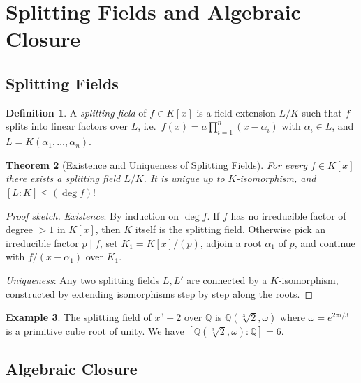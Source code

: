 \documentclass[12pt,a4paper]{amsart}
\newtheorem{theorem}{Theorem}[section]
\theoremstyle{definition}
\newtheorem{definition}[theorem]{Definition}
\newtheorem{example}[theorem]{Example}
\newcommand{\Q}{\mathbb{Q}}
\begin{document}
\section{Splitting Fields and Algebraic Closure}\label{sec:splitting}

\subsection{Splitting Fields}

\begin{definition}
A \emph{splitting field} of $f \in K[x]$ is a field extension $L/K$ such that
$f$ splits into linear factors over $L$, i.e.\ $f(x) = a \prod_{i=1}^n (x -
\alpha_i)$ with $\alpha_i \in L$, and $L = K(\alpha_1,\dots,\alpha_n)$.
\end{definition}

\begin{theorem}[Existence and Uniqueness of Splitting Fields]
\label{thm:splitfield}
For every $f \in K[x]$ there exists a splitting field $L/K$. It is unique up
to $K$-isomorphism, and $[L:K] \leq (\deg f)!$
\end{theorem}

\begin{proof}[Proof sketch]
\emph{Existence}: By induction on $\deg f$. If $f$ has no irreducible factor of
degree $> 1$ in $K[x]$, then $K$ itself is the splitting field. Otherwise pick
an irreducible factor $p \mid f$, set $K_1 = K[x]/(p)$, adjoin a root
$\alpha_1$ of $p$, and continue with $f/(x-\alpha_1)$ over $K_1$.

\emph{Uniqueness}: Any two splitting fields $L, L'$ are connected by a
$K$-isomorphism, constructed by extending isomorphisms step by step along the
roots.
\end{proof}

\begin{example}
The splitting field of $x^3 - 2$ over $\Q$ is
$\Q(\sqrt[3]{2}, \omega)$ where $\omega = e^{2\pi i/3}$ is a primitive cube
root of unity. We have $[\Q(\sqrt[3]{2},\omega):\Q] = 6$.
\end{example}

\subsection{Algebraic Closure}
\end{document}
